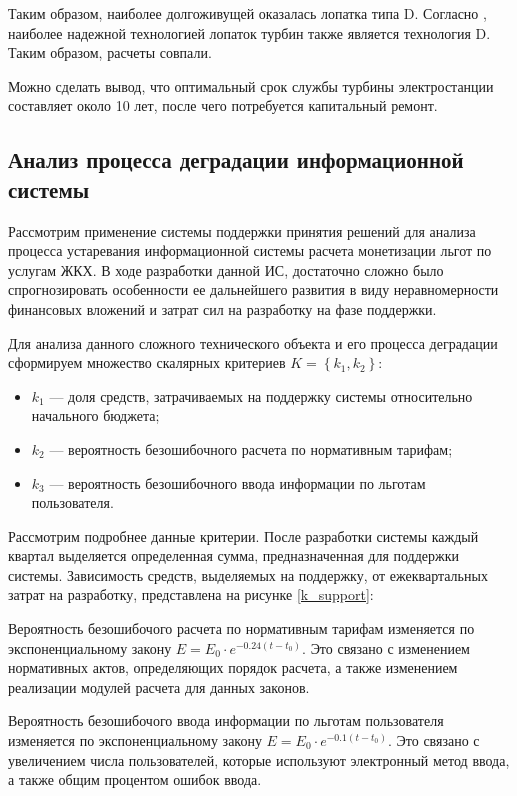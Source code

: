 Таким образом, наиболее долгоживущей оказалась лопатка типа D. 
Согласно \cite{Degradation}, наиболее надежной технологией лопаток турбин также является технология D.
Таким образом, расчеты совпали.

Можно сделать вывод, что оптимальный срок службы турбины электростанции составляет около 10 лет, после чего потребуется капитальный ремонт.

\subsection{Анализ процесса деградации информационной системы}
Рассмотрим применение системы поддержки принятия решений для анализа процесса устаревания информационной системы расчета монетизации льгот по услугам ЖКХ.
В ходе разработки данной ИС, достаточно сложно было спрогнозировать особенности ее дальнейшего развития в виду 
неравномерности финансовых вложений и затрат сил на разработку на фазе поддержки.

Для анализа данного сложного технического объекта и его процесса деградации сформируем множество скалярных критериев $K=\left\{k_1,k_2\right\}$:
\begin{itemize}
    \item $k_1$ --- доля средств, затрачиваемых на поддержку системы относительно начального бюджета;
    \item $k_2$ --- вероятность безошибочного расчета по нормативным тарифам;
    \item $k_3$ --- вероятность безошибочного ввода информации по льготам пользователя.
\end{itemize}

Рассмотрим подробнее данные критерии.
После разработки системы каждый квартал выделяется определенная сумма, предназначенная для поддержки системы.
Зависимость средств, выделяемых на поддержку, от ежеквартальных затрат на разработку, представлена на рисунке \ref{k_support}:


Вероятность безошибочого расчета по нормативным тарифам изменяется по экспоненциальному закону $E=E_0 \cdot e^{-0.24(t-t_0)}$.
Это связано с изменением нормативных актов, определяющих порядок расчета, а также изменением реализации модулей расчета для данных законов.

Вероятность безошибочого ввода информации по льготам пользователя изменяется по экспоненциальному закону $E=E_0 \cdot e^{-0.1(t-t_0)}$.
Это связано с увеличением числа пользователей, которые используют электронный метод ввода, а также общим процентом ошибок ввода.

